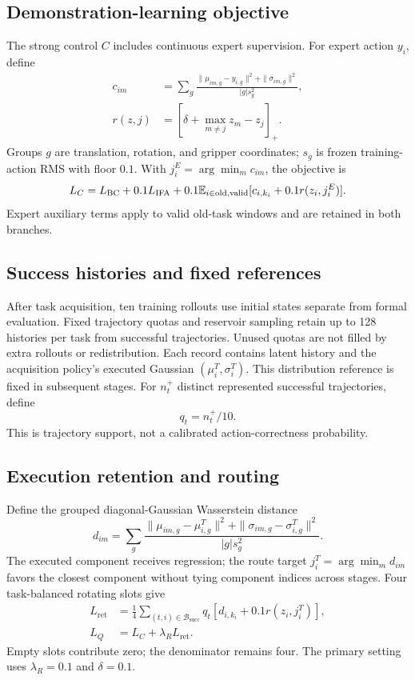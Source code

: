 \subsection{Demonstration-learning objective}
The strong control $C$ includes continuous expert supervision.
For expert action $y_i$, define
\begin{align}
c_{im}&=\sum_g\frac{\|\mu_{im,g}-y_{i,g}\|^2+\|\sigma_{im,g}\|^2}{|g|s_g^2},\\
r(z,j)&=\left[\delta+\max_{m\ne j}z_m-z_j\right]_+ .
\end{align}
Groups $g$ are translation, rotation, and gripper coordinates;
$s_g$ is frozen training-action RMS with floor $0.1$.
With $j_i^E=\arg\min_m c_{im}$, the objective is
\begin{equation}\label{eq:control}
L_C=L_{\mathrm{BC}}+0.1L_{\mathrm{IFA}}+
0.1\mathbb{E}_{i\in\mathrm{old,valid}}[c_{i,k_i}+0.1r(z_i,j_i^E)].
\end{equation}
Expert auxiliary terms apply to valid old-task windows and are retained in both branches.
\subsection{Success histories and fixed references}
After task acquisition, ten training rollouts use initial states separate
from formal evaluation. Fixed trajectory quotas and reservoir sampling retain
up to 128 histories per task from successful trajectories. Unused quotas are
not filled by extra rollouts or redistribution. Each record contains latent
history and the acquisition policy's executed Gaussian $(\mu_i^T,\sigma_i^T)$.
This distribution reference is fixed in subsequent stages. For $n_t^+$
distinct represented successful trajectories, define
\begin{equation}q_t=n_t^+/10.\end{equation}
This is trajectory support, not a calibrated action-correctness probability.
\subsection{Execution retention and routing}
Define the grouped diagonal-Gaussian Wasserstein distance
\begin{equation}
d_{im}=\sum_g\frac{\|\mu_{im,g}-\mu_{i,g}^T\|^2+
\|\sigma_{im,g}-\sigma_{i,g}^T\|^2}{|g|s_g^2}.
\end{equation}
The executed component receives regression; the route target
$j_i^T=\arg\min_m d_{im}$ favors the closest component without tying
component indices across stages. Four task-balanced rotating slots give
\begin{align}
L_{\mathrm{ret}}&=\frac14\sum_{(t,i)\in\mathcal B_{\mathrm{succ}}}
q_t[d_{i,k_i}+0.1r(z_i,j_i^T)],\\
L_Q&=L_C+\lambda_RL_{\mathrm{ret}} .
\end{align}
Empty slots contribute zero; the denominator remains four.
The primary setting uses $\lambda_R=0.1$ and $\delta=0.1$.
